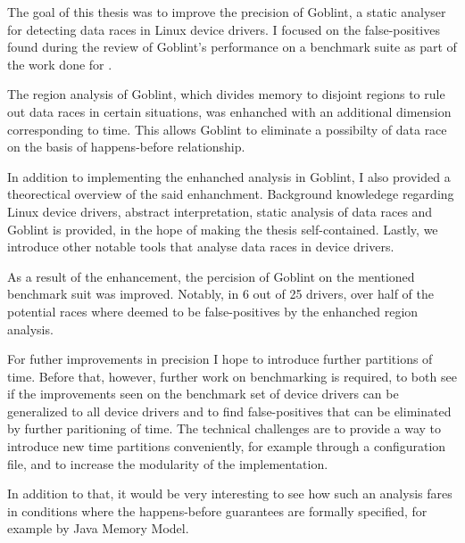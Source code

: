 \documentclass[..thesis.tex]{subfiles}
\begin{document}
The goal of this thesis was to improve the precision of Goblint, a static analyser for detecting data races in Linux device drivers. I focused on the false-positives found during the review of Goblint's performance on a benchmark suite as part of the work done for . 

The region analysis of Goblint, which divides memory to disjoint regions to rule out data races in certain situations, was enhanched with an additional dimension corresponding to time. This allows Goblint to eliminate a possibilty of data race on the basis of happens-before relationship. 

In addition to implementing the enhanched analysis in Goblint, I also provided a theorectical overview of the said enhanchment. Background knowledege regarding Linux device drivers, abstract interpretation, static analysis of data races and Goblint is provided, in the hope of making the thesis self-contained. Lastly, we introduce other notable tools that analyse data races in device drivers.

As a result of the enhancement, the percision of Goblint on the mentioned benchmark suit was improved. Notably, in 6 out of 25 drivers, over half of the potential races where deemed to be false-positives by the enhanched region analysis.
 
For futher improvements in precision I hope to introduce further partitions of time. Before that, however, further work on benchmarking is required, to both see if the improvements seen on the benchmark set of device drivers can be generalized to all device drivers and to find false-positives that can be eliminated by further paritioning of time. The technical challenges are to provide a way to introduce new time partitions conveniently, for example through a configuration file, and to increase the modularity of the implementation.

In addition to that, it would be very interesting to see how such an analysis fares in conditions where the happens-before guarantees are formally specified, for example by Java Memory Model.
\end{document}
